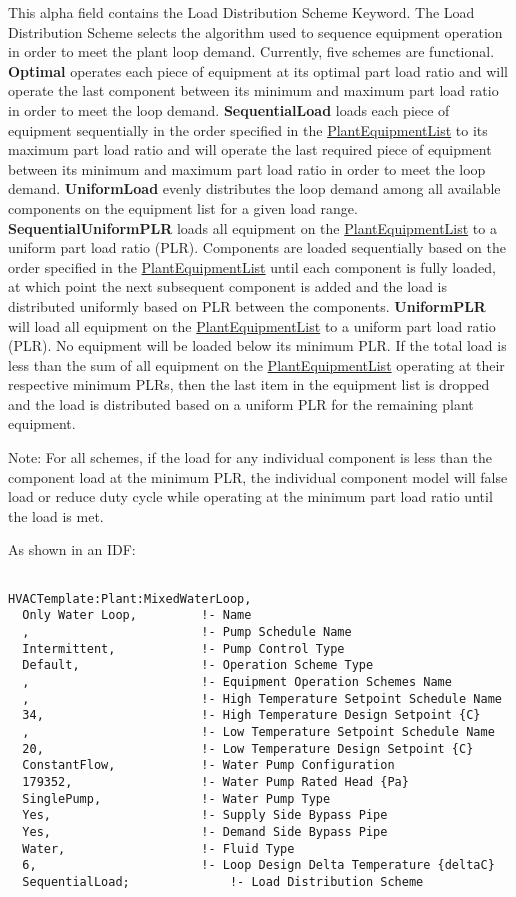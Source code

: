 This alpha field contains the Load Distribution Scheme Keyword. The Load Distribution Scheme selects the algorithm used to sequence equipment operation in order to meet the plant loop demand. Currently, five schemes are functional. \textbf{Optimal} operates each piece of equipment at its optimal part load ratio and will operate the last component between its minimum and maximum part load ratio in order to meet the loop demand. \textbf{SequentialLoad} loads each piece of equipment sequentially in the order specified in the \hyperref[plantequipmentlist]{PlantEquipmentList} to its maximum part load ratio and will operate the last required piece of equipment between its minimum and maximum part load ratio in order to meet the loop demand. \textbf{UniformLoad} evenly distributes the loop demand among all available components on the equipment list for a given load range. \textbf{SequentialUniformPLR} loads all equipment on the \hyperref[plantequipmentlist]{PlantEquipmentList} to a uniform part load ratio (PLR). Components are loaded sequentially based on the order specified in the \hyperref[plantequipmentlist]{PlantEquipmentList} until each component is fully loaded, at which point the next subsequent component is added and the load is distributed uniformly based on PLR between the components. \textbf{UniformPLR} will load all equipment on the \hyperref[plantequipmentlist]{PlantEquipmentList} to a uniform part load ratio (PLR). No equipment will be loaded below its minimum PLR. If the total load is less than the sum of all equipment on the \hyperref[plantequipmentlist]{PlantEquipmentList} operating at their respective minimum PLRs, then the last item in the equipment list is dropped and the load is distributed based on a uniform PLR for the remaining plant equipment.

Note: For all schemes, if the load for any individual component is less than the component load at the minimum PLR, the individual component model will false load or reduce duty cycle while operating at the minimum part load ratio until the load is met.

As shown in an IDF:

\begin{lstlisting}

HVACTemplate:Plant:MixedWaterLoop,
  Only Water Loop,         !- Name
  ,                        !- Pump Schedule Name
  Intermittent,            !- Pump Control Type
  Default,                 !- Operation Scheme Type
  ,                        !- Equipment Operation Schemes Name
  ,                        !- High Temperature Setpoint Schedule Name
  34,                      !- High Temperature Design Setpoint {C}
  ,                        !- Low Temperature Setpoint Schedule Name
  20,                      !- Low Temperature Design Setpoint {C}
  ConstantFlow,            !- Water Pump Configuration
  179352,                  !- Water Pump Rated Head {Pa}
  SinglePump,              !- Water Pump Type
  Yes,                     !- Supply Side Bypass Pipe
  Yes,                     !- Demand Side Bypass Pipe
  Water,                   !- Fluid Type
  6,                       !- Loop Design Delta Temperature {deltaC}
  SequentialLoad;              !- Load Distribution Scheme
\end{lstlisting}
